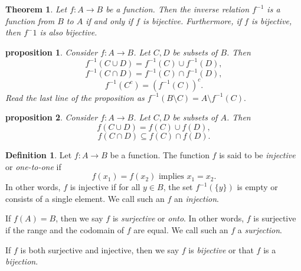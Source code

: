 \documentclass{article}
\newtheorem{theorem}{Theorem}[section]
\newtheorem{proposition}{Proposition}[section]
\newtheorem{proposition}{proposition}[section]
\theoremstyle{definition}
\newtheorem{definition}{Definition}[section]
\theoremstyle{remark}
\begin{document}
\begin{theorem}
Let $f:A \to B$ be a function. Then the inverse relation $f^{-1}$ is a function from $B$ to $A$ if and only if $f$ is bijective. Furthermore, if $f$ is bijective, then $f^-1$ is also bijective. 
\end{theorem}













\begin{proposition} \label{prop:inverse_image_properties}
Consider \( f: A \to B \). Let \( C, D \) be subsets of \( B \). Then
\[
f^{-1}(C \cup D) = f^{-1}(C) \cup f^{-1}(D),
\]
\[
f^{-1}(C \cap D) = f^{-1}(C) \cap f^{-1}(D),
\]
\[
f^{-1}(C^c) = (f^{-1}(C))^c.
\]
Read the last line of the proposition as $f^{-1}( B \setminus C) = A \setminus f^{-1} (C)\text{.}$
\end{proposition}


























\begin{proposition} \label{prop:direct_image_properties}
Consider \( f: A \to B \). Let \( C, D \) be subsets of \( A \). Then
\[
f(C \cup D) = f(C) \cup f(D),
\]
\[
f(C \cap D) \subseteq f(C) \cap f(D).
\]
\end{proposition}





















\begin{definition} \label{def:injective_surjective_bijective}
Let \( f: A \to B \) be a function. The function \( f \) is said to be \textit{injective} or \textit{one-to-one} if
\[
f(x_1) = f(x_2) \text{ implies } x_1 = x_2.
\]
In other words, \( f \) is injective if for all \( y \in B \), the set \( f^{-1}(\{y\}) \) is empty or consists of a single element. We call such an \( f \) an \textit{injection}.

If \( f(A) = B \), then we say \( f \) is \textit{surjective} or \textit{onto}. In other words, \( f \) is surjective if the range and the codomain of \( f \) are equal. We call such an \( f \) a \textit{surjection}.

If \( f \) is both surjective and injective, then we say \( f \) is \textit{bijective} or that \( f \) is a \textit{bijection}.
\end{definition}
\end{document}

